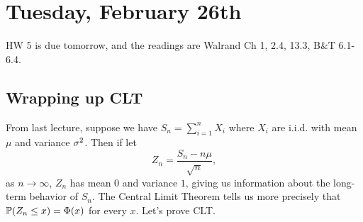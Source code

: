 \documentclass[11 pt]{scrartcl}
\begin{document}
\newpage
\section{Tuesday, February 26th}
HW 5 is due tomorrow, and the readings are Walrand Ch 1, 2.4, 13.3, B\&T 6.1-6.4. 

\subsection{Wrapping up CLT}
From last lecture, suppose we have $S_n = \sum_{i=1}^n X_i$ where $X_i$ are i.i.d. with mean $\mu$ and variance $\sigma^2$. Then if let 
\[ Z_n = \dfrac{S_n - n\mu}{\sqrt{n}},\]
as $n\to\infty$, $Z_n$ has mean $0$ and variance $1$, giving us information about the long-term behavior of $S_n$. The Central Limit Theorem tells us more precisely that $\mathbb P(Z_n\leq x) = \Phi(x)$ for every $x$. Let's prove CLT. 
\end{document}

